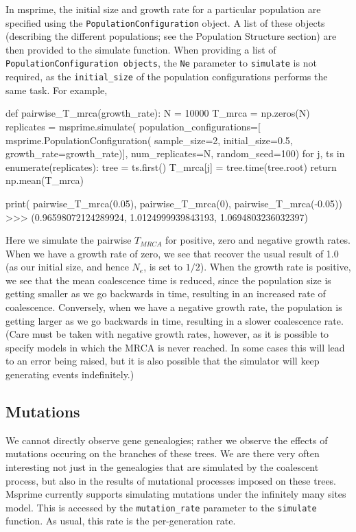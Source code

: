 \documentclass[graybox]{svmult}
\begin{document}
In msprime, the initial size and growth rate for a particular population
are specified using the \texttt{PopulationConfiguration} object. A list
of these objects (describing the different populations; see the
Population Structure section) are then provided to the simulate
function. When providing a list of
\texttt{PopulationConfiguration\ objects}, the \texttt{Ne} parameter to
\texttt{simulate} is not required, as the \texttt{initial\_size} of the
population configurations performs the same task. For example,

\begin{pythoncode}
def pairwise_T_mrca(growth_rate):
    N = 10000
    T_mrca = np.zeros(N)
    replicates = msprime.simulate(
        population_configurations=[
             msprime.PopulationConfiguration(
                sample_size=2, initial_size=0.5,
                growth_rate=growth_rate)],
        num_replicates=N, random_seed=100)
    for j, ts in enumerate(replicates):
        tree = ts.first()
        T_mrca[j] = tree.time(tree.root)
    return np.mean(T_mrca)

print(
    pairwise_T_mrca(0.05), pairwise_T_mrca(0),
    pairwise_T_mrca(-0.05))
>>> (0.96598072124289924, 1.0124999939843193, 1.0694803236032397)
\end{pythoncode}

    Here we simulate the pairwise \(T_{MRCA}\) for positive, zero and
negative growth rates. When we have a growth rate of zero, we see that
recover the usual result of 1.0 (as our initial size, and hence \(N_e\),
is set to \(1/2\)). When the growth rate is positive, we see that the
mean coalescence time is reduced, since the population size is getting
smaller as we go backwards in time, resulting in an increased rate of
coalescence. Conversely, when we have a negative growth rate, the
population is getting larger as we go backwards in time, resulting in a
slower coalescence rate. (Care must be taken with negative growth rates,
however, as it is possible to specify models in which the MRCA is never
reached. In some cases this will lead to an error being raised, but it
is also possible that the simulator will keep generating events
indefinitely.)

    \subsection{Mutations}\label{mutations}

We cannot directly observe gene genealogies; rather we observe the
effects of mutations occuring on the branches of these trees. We are
there very often interesting not just in the genealogies that are
simulated by the coalescent process, but also in the results of
mutational processes imposed on these trees. Msprime currently supports
simulating mutations under the infinitely many sites model. This is
accessed by the \texttt{mutation\_rate} parameter to the
\texttt{simulate} function. As usual, this rate is the per-generation
rate.
\end{document}
